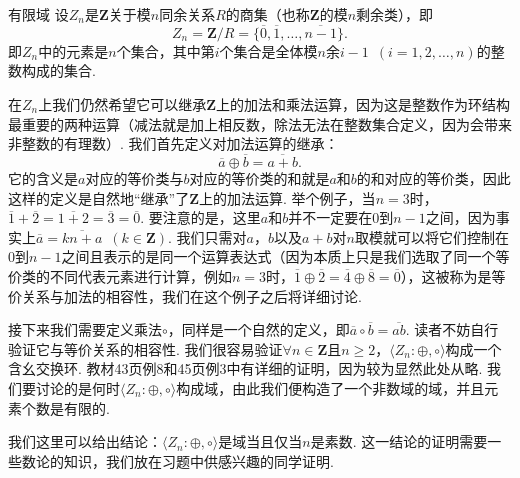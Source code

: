 \begin{example}{}{有限域}
    设$Z_n$是$\mathbf{Z}$关于模$n$同余关系$R$的商集（也称$\mathbf{Z}$的模$n$剩余类），即
    \[Z_n=\mathbf{Z}/R=\{\overline{0},\overline{1},\ldots,\overline{n-1}\}.\]
    即$Z_n$中的元素是$n$个集合，其中第$i$个集合是全体模$n$余$i-1\enspace(i=1,2,\ldots,n)$的整数构成的集合.

    在$Z_n$上我们仍然希望它可以继承$\mathbf{Z}$上的加法和乘法运算，因为这是整数作为环结构最重要的两种运算（减法就是加上相反数，除法无法在整数集合定义，因为会带来非整数的有理数）. 我们首先定义对加法运算的继承：
    \[\overline{a}\oplus\overline{b}=\overline{a+b}.\]
    它的含义是$a$对应的等价类与$b$对应的等价类的和就是$a$和$b$的和对应的等价类，因此这样的定义是自然地``继承''了$\mathbf{Z}$上的加法运算. 举个例子，当$n=3$时，$\overline{1}+\overline{2}=\overline{1+2}=\overline{3}=\overline{0}$. 要注意的是，这里$a$和$b$并不一定要在$0$到$n-1$之间，因为事实上$\overline{a}=\overline{kn+a}\enspace(k\in\mathbf{Z})$. 我们只需对$a$，$b$以及$a+b$对$n$取模就可以将它们控制在$0$到$n-1$之间且表示的是同一个运算表达式（因为本质上只是我们选取了同一个等价类的不同代表元素进行计算，例如$n=3$时，$\overline{1}\oplus\overline{2}=\overline{4}\oplus\overline{8}=\overline{0}$），这被称为是等价关系与加法的相容性，我们在这个例子之后将详细讨论.

    接下来我们需要定义乘法$\circ$，同样是一个自然的定义，即$\overline{a}\circ\overline{b}=\overline{ab}$. 读者不妨自行验证它与等价关系的相容性. 我们很容易验证$\forall n\in\mathbf{Z}$且$n\geqslant 2$，$\langle Z_n:\oplus,\circ\rangle$构成一个含幺交换环. 教材43页例8和45页例3中有详细的证明，因为较为显然此处从略. 我们要讨论的是何时$\langle Z_n:\oplus,\circ\rangle$构成域，由此我们便构造了一个非数域的域，并且元素个数是有限的.

    我们这里可以给出结论：$\langle Z_n:\oplus,\circ\rangle$是域当且仅当$n$是素数. 这一结论的证明需要一些数论的知识，我们放在习题中供感兴趣的同学证明.
\end{example}


